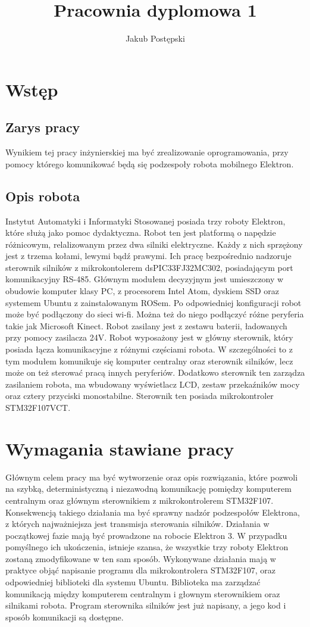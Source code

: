 \documentclass[10pt,a4paper]{article}
\author{Jakub Postępski}
\title{Pracownia dyplomowa 1}
\begin{document}
	\maketitle
	\section{Wstęp}
	\subsection{Zarys pracy}
	Wynikiem tej pracy inżynierskiej ma być zrealizowanie oprogramowania, przy pomocy którego komunikować będą się podzespoły robota mobilnego Elektron. 
	\subsection{Opis robota}
	Instytut Automatyki i Informatyki Stosowanej posiada trzy roboty Elektron, które służą jako pomoc dydaktyczna. Robot ten jest platformą o napędzie różnicowym, relalizowanym przez dwa silniki elektryczne. Każdy z nich sprzężony jest z trzema kołami, lewymi bądź prawymi. Ich pracę bezpośrednio nadzoruje sterownik silników z mikrokontolerem dsPIC33FJ32MC302, posiadającym port komunikacyjny RS-485. Głównym modułem decyzyjnym jest umieszczony w obudowie komputer klasy PC, z procesorem Intel Atom, dyskiem SSD oraz systemem Ubuntu z zainstalowanym ROSem. Po odpowiedniej konfiguracji robot może być podłączony do sieci wi-fi. Można też do niego podłączyć różne peryferia takie jak Microsoft Kinect. Robot zasilany jest z zestawu baterii, ładowanych przy pomocy zasilacza 24V. \newline
	Robot wyposażony jest w główny sterownik, który posiada łącza komunikacyjne z różnymi częściami robota. W szczególności to z tym modułem komunikuje się komputer centralny oraz sterownik silników, lecz może on też sterować pracą innych peryferiów. Dodatkowo sterownik ten zarządza zasilaniem robota, ma wbudowany wyświetlacz LCD, zestaw przekaźników mocy oraz cztery przyciski monostabilne. Sterownik ten posiada mikrokontroler STM32F107VCT.	
	\section{Wymagania stawiane pracy}
	Głównym celem pracy ma być wytworzenie oraz opis rozwiązania, które pozwoli na szybką, deterministyczną i niezawodną komunikację pomiędzy komputerem centralnym oraz głównym sterownikiem z mikrokontrolerem STM32F107. Konsekwencją takiego działania ma być sprawny nadzór podzespołów Elektrona, z których najważniejsza jest transmisja sterowania silników. Działania w początkowej fazie mają być prowadzone na robocie Elektron 3. W przypadku pomyślnego ich ukończenia, istnieje szansa, że wszystkie trzy roboty Elektron zostaną zmodyfikowane w ten sam sposób. Wykonywane działania mają w praktyce objąć napisanie programu dla mikrokontrolera STM32F107, oraz odpowiedniej biblioteki dla systemu Ubuntu. Biblioteka ma zarządzać komunikacją między komputerem centralnym i głownym sterownikiem oraz silnikami robota. Program sterownika silników jest już napisany, a jego kod i sposób komunikacji są dostępne.
\end{document}

